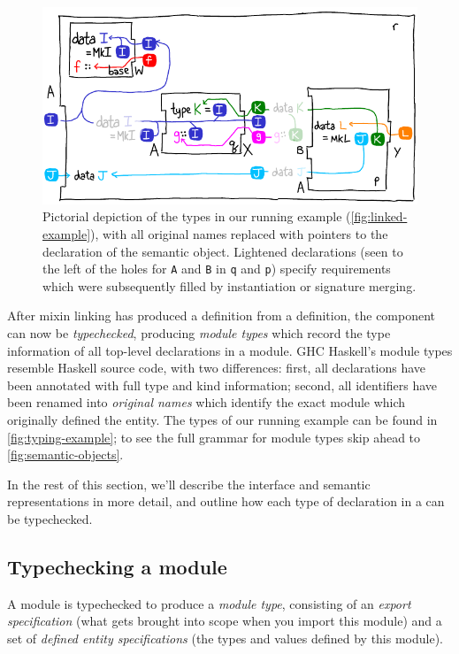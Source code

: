 \begin{figure}
\center\includegraphics{figures/pqr-type-diagram.pdf}
\caption{Pictorial depiction of the types in our running example
(\cref{fig:linked-example}), with all original names replaced with
pointers to the declaration of the semantic object.
Lightened declarations (seen to the left of the holes for \texttt{A} and
\texttt{B} in \texttt{q} and \texttt{p}) specify requirements which
were subsequently filled by instantiation or signature merging.}
\label{fig:typing-example-diagram}
\end{figure}

After mixin linking has produced a \unit{} definition from a \ccomp{}
definition, the component can now be \emph{typechecked}, producing \emph{module types}
which record the type information
of all top-level declarations in a module.
GHC Haskell's module types resemble Haskell source code,
with two differences:
first, all declarations have been annotated with full type and kind
information; second, all identifiers have been renamed into \emph{original
names} which identify the exact module which originally defined the
entity.  The types of our running example can be found
in \cref{fig:typing-example}; to see the full grammar for module
types skip ahead to \cref{fig:semantic-objects}.

In the rest of this section, we'll describe the interface and semantic
representations in more detail, and outline how each type of declaration
in a \unit{} can be typechecked.

\subsection{Typechecking a module}

A module is typechecked to produce a \emph{module
type}, consisting of an \emph{export
specification} (what gets brought into scope when
you import this module) and a set of \emph{defined entity specifications}
(the types and values defined by this module).


